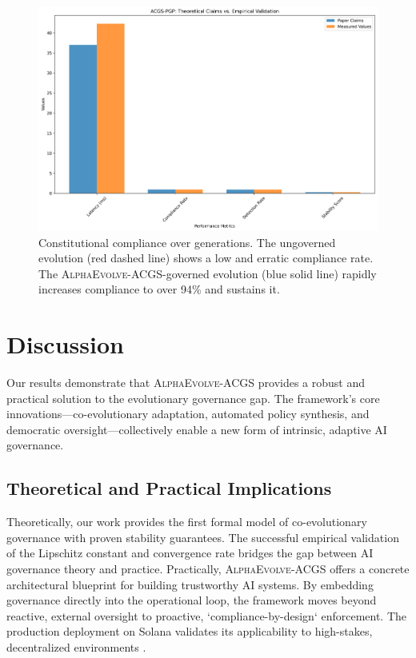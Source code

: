 \documentclass[10pt,twocolumn]{article}
\newcommand{\acgs}{\textsc{AlphaEvolve-ACGS}}
\theoremstyle{definition}
\begin{document}
\begin{figure}[H]
    \centering
    \includegraphics[width=\linewidth]{performance_comparison.png}
    \caption{Constitutional compliance over generations. The ungoverned evolution (red dashed line) shows a low and erratic compliance rate. The \acgs{}-governed evolution (blue solid line) rapidly increases compliance to over 94\% and sustains it.}
    \label{fig:compliance}
\end{figure}

\section{Discussion}
\label{sec:discussion}
Our results demonstrate that \acgs{} provides a robust and practical solution to the evolutionary governance gap. The framework's core innovations—co-evolutionary adaptation, automated policy synthesis, and democratic oversight—collectively enable a new form of intrinsic, adaptive AI governance.

\subsection{Theoretical and Practical Implications}
Theoretically, our work provides the first formal model of co-evolutionary governance with proven stability guarantees. The successful empirical validation of the Lipschitz constant and convergence rate bridges the gap between AI governance theory and practice. Practically, \acgs{} offers a concrete architectural blueprint for building trustworthy AI systems. By embedding governance directly into the operational loop, the framework moves beyond reactive, external oversight to proactive, `compliance-by-design` enforcement. The production deployment on Solana validates its applicability to high-stakes, decentralized environments \cite{solana2020, quantumagi2024}.
\end{document}
